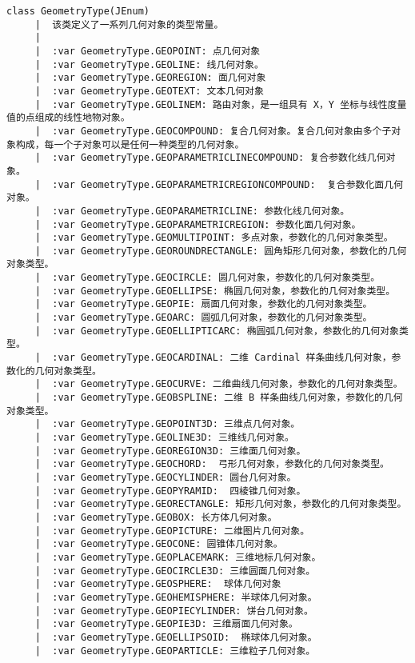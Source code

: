 \documentclass[11pt]{article}
\begin{document}
\begin{Verbatim}[commandchars=\\\{\}]
    class GeometryType(JEnum)
     |  该类定义了一系列几何对象的类型常量。
     |  
     |  :var GeometryType.GEOPOINT: 点几何对象
     |  :var GeometryType.GEOLINE: 线几何对象。
     |  :var GeometryType.GEOREGION: 面几何对象
     |  :var GeometryType.GEOTEXT: 文本几何对象
     |  :var GeometryType.GEOLINEM: 路由对象，是一组具有 X，Y 坐标与线性度量值的点组成的线性地物对象。
     |  :var GeometryType.GEOCOMPOUND: 复合几何对象。复合几何对象由多个子对象构成，每一个子对象可以是任何一种类型的几何对象。
     |  :var GeometryType.GEOPARAMETRICLINECOMPOUND: 复合参数化线几何对象。
     |  :var GeometryType.GEOPARAMETRICREGIONCOMPOUND:  复合参数化面几何对象。
     |  :var GeometryType.GEOPARAMETRICLINE: 参数化线几何对象。
     |  :var GeometryType.GEOPARAMETRICREGION: 参数化面几何对象。
     |  :var GeometryType.GEOMULTIPOINT: 多点对象，参数化的几何对象类型。
     |  :var GeometryType.GEOROUNDRECTANGLE: 圆角矩形几何对象，参数化的几何对象类型。
     |  :var GeometryType.GEOCIRCLE: 圆几何对象，参数化的几何对象类型。
     |  :var GeometryType.GEOELLIPSE: 椭圆几何对象，参数化的几何对象类型。
     |  :var GeometryType.GEOPIE: 扇面几何对象，参数化的几何对象类型。
     |  :var GeometryType.GEOARC: 圆弧几何对象，参数化的几何对象类型。
     |  :var GeometryType.GEOELLIPTICARC: 椭圆弧几何对象，参数化的几何对象类型。
     |  :var GeometryType.GEOCARDINAL: 二维 Cardinal 样条曲线几何对象，参数化的几何对象类型。
     |  :var GeometryType.GEOCURVE: 二维曲线几何对象，参数化的几何对象类型。
     |  :var GeometryType.GEOBSPLINE: 二维 B 样条曲线几何对象，参数化的几何对象类型。
     |  :var GeometryType.GEOPOINT3D: 三维点几何对象。
     |  :var GeometryType.GEOLINE3D: 三维线几何对象。
     |  :var GeometryType.GEOREGION3D: 三维面几何对象。
     |  :var GeometryType.GEOCHORD:  弓形几何对象，参数化的几何对象类型。
     |  :var GeometryType.GEOCYLINDER: 圆台几何对象。
     |  :var GeometryType.GEOPYRAMID:  四棱锥几何对象。
     |  :var GeometryType.GEORECTANGLE: 矩形几何对象，参数化的几何对象类型。
     |  :var GeometryType.GEOBOX: 长方体几何对象。
     |  :var GeometryType.GEOPICTURE: 二维图片几何对象。
     |  :var GeometryType.GEOCONE: 圆锥体几何对象。
     |  :var GeometryType.GEOPLACEMARK: 三维地标几何对象。
     |  :var GeometryType.GEOCIRCLE3D: 三维圆面几何对象。
     |  :var GeometryType.GEOSPHERE:  球体几何对象
     |  :var GeometryType.GEOHEMISPHERE: 半球体几何对象。
     |  :var GeometryType.GEOPIECYLINDER: 饼台几何对象。
     |  :var GeometryType.GEOPIE3D: 三维扇面几何对象。
     |  :var GeometryType.GEOELLIPSOID:  椭球体几何对象。
     |  :var GeometryType.GEOPARTICLE: 三维粒子几何对象。

\end{Verbatim}
\end{document}
